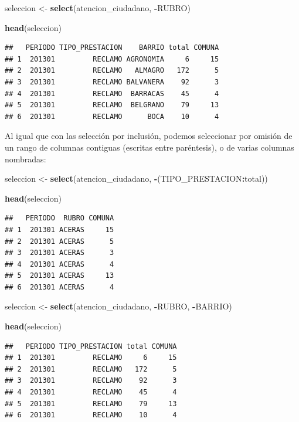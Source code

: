 \documentclass[spanish,]{book}
\newenvironment{Shaded}{\begin{snugshade}}{\end{snugshade}}
\newcommand{\KeywordTok}[1]{\textcolor[rgb]{0.13,0.29,0.53}{\textbf{#1}}}
\newcommand{\NormalTok}[1]{#1}
\newcommand{\OperatorTok}[1]{\textcolor[rgb]{0.81,0.36,0.00}{\textbf{#1}}}
\newcommand{\StringTok}[1]{\textcolor[rgb]{0.31,0.60,0.02}{#1}}
\begin{document}
\begin{Shaded}
\begin{Highlighting}[]
\NormalTok{seleccion <-}\StringTok{ }\KeywordTok{select}\NormalTok{(atencion_ciudadano, }\OperatorTok{-}\NormalTok{RUBRO)}

\KeywordTok{head}\NormalTok{(seleccion)}
\end{Highlighting}
\end{Shaded}

\begin{verbatim}
##   PERIODO TIPO_PRESTACION    BARRIO total COMUNA
## 1  201301         RECLAMO AGRONOMIA     6     15
## 2  201301         RECLAMO   ALMAGRO   172      5
## 3  201301         RECLAMO BALVANERA    92      3
## 4  201301         RECLAMO  BARRACAS    45      4
## 5  201301         RECLAMO  BELGRANO    79     13
## 6  201301         RECLAMO      BOCA    10      4
\end{verbatim}

Al igual que con las selección por inclusión, podemos seleccionar por omisión de un rango de columnas contiguas (escritas entre paréntesis), o de varias columnas nombradas:

\begin{Shaded}
\begin{Highlighting}[]
\NormalTok{seleccion <-}\StringTok{ }\KeywordTok{select}\NormalTok{(atencion_ciudadano, }\OperatorTok{-}\NormalTok{(TIPO_PRESTACION}\OperatorTok{:}\NormalTok{total))}

\KeywordTok{head}\NormalTok{(seleccion)}
\end{Highlighting}
\end{Shaded}

\begin{verbatim}
##   PERIODO  RUBRO COMUNA
## 1  201301 ACERAS     15
## 2  201301 ACERAS      5
## 3  201301 ACERAS      3
## 4  201301 ACERAS      4
## 5  201301 ACERAS     13
## 6  201301 ACERAS      4
\end{verbatim}

\begin{Shaded}
\begin{Highlighting}[]
\NormalTok{seleccion <-}\StringTok{ }\KeywordTok{select}\NormalTok{(atencion_ciudadano, }\OperatorTok{-}\NormalTok{RUBRO, }\OperatorTok{-}\NormalTok{BARRIO)}

\KeywordTok{head}\NormalTok{(seleccion)}
\end{Highlighting}
\end{Shaded}

\begin{verbatim}
##   PERIODO TIPO_PRESTACION total COMUNA
## 1  201301         RECLAMO     6     15
## 2  201301         RECLAMO   172      5
## 3  201301         RECLAMO    92      3
## 4  201301         RECLAMO    45      4
## 5  201301         RECLAMO    79     13
## 6  201301         RECLAMO    10      4
\end{verbatim}
\end{document}

